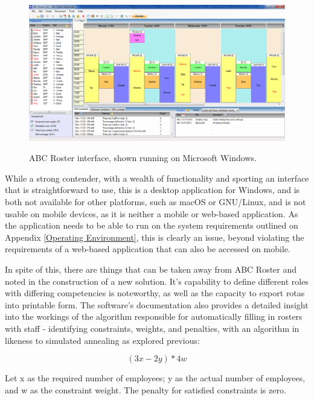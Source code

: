 \begin{figure}[!ht]
    \includegraphics[width=\textwidth]{Figures/abcroster}
    \caption{ABC Roster interface, shown running on Microsoft Windows.}
    \label{fig:abc} \cite{ABC1}
\end{figure}

While a strong contender, with a wealth of functionality and sporting an interface that is straightforward to use, this is a desktop application for Windows, and is both not available for other platforms, such as macOS or GNU/Linux, and is not usable on mobile devices, as it is neither a mobile or web-based application. As the application needs to be able to run on the system requirements outlined on Appendix \ref{Operating Environment}, this is clearly an issue, beyond violating the requirements of a web-based application that can also be accessed on mobile.

In spite of this, there are things that can be taken away from ABC Roster and noted in the construction of a new solution. It's capability to define different roles with differing competencies is noteworthy, as well as the capacity to export rotas into printable form. \cite{ABC1} The software's documentation also provides a detailed insight into the workings of the algorithm responsible for automatically filling in rosters with staff - identifying constraints, weights, and penalties, with an algorithm in likeness to simulated annealing as explored previous:

\[ (3x - 2y) * 4w \]

Let x as the required number of employees; y as the actual number of employees, and w as the constraint weight. The penalty for satisfied constraints is zero. \cite{ABC2}

